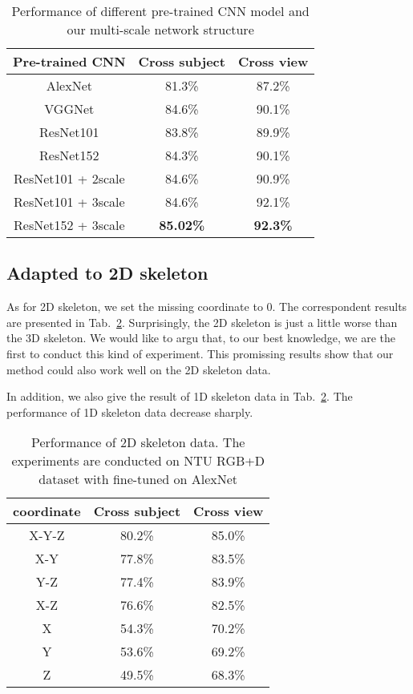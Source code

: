 \documentclass[10pt,journal]{IEEEtran}
\begin{document}
\begin{table}[htb]
\begin{center}
\caption{Performance of different pre-trained CNN model and our multi-scale network structure} \label{tab:network}
\begin{tabular}{  c  c  c }
\hline
Pre-trained CNN              &Cross subject &Cross view \\
\hline
AlexNet     & 81.3\% &87.2\% \\
VGGNet     & 84.6\% &90.1\% \\
ResNet101     & 83.8\% &89.9\% \\
ResNet152     & 84.3\% &90.1\% \\
ResNet101 + 2scale     & {84.6\%} &{90.9\%} \\
ResNet101 + 3scale     & {84.6\%} &{92.1\%} \\
ResNet152 + 3scale     & \bf{85.02\%} &\bf{92.3\%} \\
\hline
\end{tabular}
\end{center}
\end{table}

\subsection{Adapted to 2D skeleton}

As for 2D skeleton, we set the missing coordinate to 0. The correspondent results are presented in Tab.~\ref{tab:1D}. Surprisingly, the 2D skeleton is just a little worse than the 3D skeleton. We would like to argu that, to our best knowledge, we are the first to conduct this kind of experiment. This promissing results show that our method could also work well on the 2D skeleton data.

In addition, we also give the result of 1D skeleton data in Tab.~\ref{tab:1D}. The performance of 1D skeleton data decrease sharply.

\begin{table}[htb]
\begin{center}
\caption{Performance of 2D skeleton data. The experiments are conducted on NTU RGB+D dataset with fine-tuned on AlexNet} \label{tab:1D}
\begin{tabular}{  c  c  c }
\hline
coordinate              &Cross subject &Cross view \\
\hline
X-Y-Z     & 80.2\% &85.0\% \\
X-Y     & 77.8\% &83.5\% \\
Y-Z     & 77.4\% &83.9\% \\
X-Z     & 76.6\% &82.5\% \\
X     & {54.3\%} &{70.2\%} \\
Y     & {53.6\%} &{69.2\%} \\
Z     & {49.5\%} &{68.3\%} \\
\hline
\end{tabular}
\end{center}
\end{table}
\end{document}
